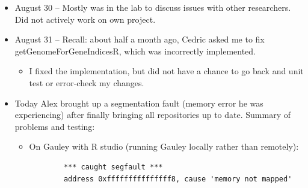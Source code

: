 \documentclass[12pt,hyperref]{labbook}
\begin{document}

\begin{itemize}
    \item August 30 -- Mostly was in the lab to discuss issues with other researchers.
    Did not actively work on own project.
    \item August 31 -- Recall: about half a month ago, Cedric asked me to fix getGenomeForGeneIndicesR, which was incorrectly implemented.
    \begin{itemize}
        \item I fixed the implementation, but did not have a chance to go back and unit test or error-check my changes.
    \end{itemize}
    \item Today Alex brought up a segmentation fault (memory error he was experiencing) after finally bringing all repositories up to date.
    Summary of problems and testing:
    \begin{itemize}
        \item On Gauley with R studio (running Gauley locally rather than remotely):
        \begin{lstlisting}
        *** caught segfault ***
        address 0xfffffffffffffff8, cause 'memory not mapped'


\end{lstlisting}
\end{itemize}
\end{itemize}
\end{document}
